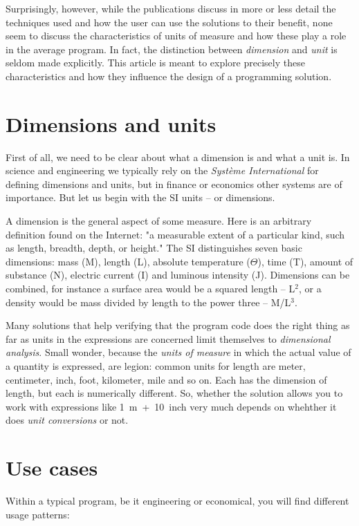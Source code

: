 \documentclass{article}
\begin{document}
Surprisingly, however, while the publications discuss in more or less detail the techniques used and how the user can use
the solutions to their benefit, none seem to discuss the characteristics of units of measure and how these play a role
in the average program. In fact, the distinction between \emph{dimension} and \emph{unit} is seldom made explicitly. This
article is meant to explore precisely these characteristics and how they influence the design of a programming solution.


\section{Dimensions and units}
First of all, we need to be clear about what a dimension is and what a unit is. In science and engineering we typically
rely on the \emph{Syst\`eme International} for defining dimensions and units, but in finance or economics other systems
are of importance. But let us begin with the SI units -- or dimensions.

A dimension is the general aspect of some measure. Here is an arbitrary definition found on the Internet:
"a measurable extent of a particular kind, such as length, breadth, depth, or height." The SI distinguishes seven
basic dimensions: mass (M), length (L), absolute temperature ($\Theta$), time (T), amount of substance (N), electric current (I)
and luminous intensity (J). Dimensions can be combined, for instance a surface area would be a squared length -- L$^2$, or
a density would be mass divided by length to the power three -- M/L$^3$.

Many solutions that help verifying that the program code does the right thing as far as units in the expressions are concerned
limit themselves to \emph{dimensional analysis}. Small wonder, because the \emph{units of measure} in which the actual
value of a quantity is expressed, are legion: common units for length are meter, centimeter, inch, foot, kilometer, mile and
so on. Each has the dimension of length, but each is numerically different. So, whether the solution allows you to work with
expressions like 1~m~+~10~inch very much depends on whehther it does \emph{unit conversions} or not.


\section{Use cases}
Within a typical program, be it engineering or economical, you will find different usage patterns:
\end{document}
